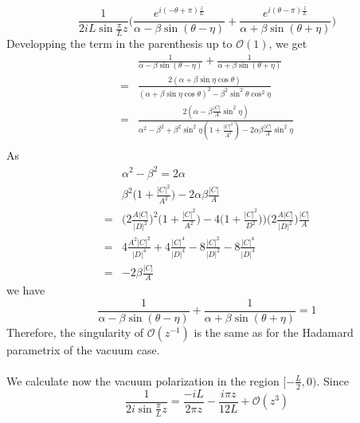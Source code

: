 \begin{equation}
\frac{1}{2i L\sin\frac{\pi}{L}z} \bigg( \frac{e^{i(-\theta + \pi)\frac{z}{L}}}{\alpha - \beta \sin (\theta - \eta)}
+ \frac{e^{i(\theta - \pi) \frac{z}{L}}}{\alpha + \beta \sin (\theta + \eta)}
\bigg)
\end{equation}
Developping the term in the parenthesis up to $\mathcal{O}(1)$, we get
\begin{equation}
\begin{split}
& \frac{1}{\alpha - \beta \sin (\theta - \eta)}
   + \frac{1}{\alpha + \beta \sin (\theta + \eta)} \\
= & \frac{2(\alpha + \beta \sin \eta \cos \theta)}{(\alpha + \beta \sin \eta \cos \theta)^2 - \beta^2 \sin^2 \theta \cos^2 \eta} \\
= & \frac{2(\alpha - \beta \frac{|C|}{A} \sin^2 \eta)}{\alpha^2 - \beta^2 + \beta^2 \sin^2 \eta (1 + \frac{|C|^2}{A^2}) - 2 \alpha \beta \frac{|C|}{A} \sin^2 \eta} \\
\end{split}
\end{equation}
As
\begin{equation*}
\begin{split}
& \alpha^2 - \beta ^ 2 = 2 \alpha \\
&  \beta^2 \big(1 + \frac{|C|^2}{A^2} \big) - 2 \alpha \beta \frac{|C|}{A} \\
= & \big(2\frac{A |C|}{|D|^2} \big)^2 \big( 1+ \frac{|C|^2}{A^2} \big) - 4\big( 1+ \frac{|C|^2}{D^2}))\big(2\frac{A |C|}{|D|^2} \big) \frac{|C|}{A}  \\
= & 4 \frac{A^2 |C|^2}{|D|^4} + 4\frac{|C|^4}{|D|^4} - 8\frac{|C|^2}{|D|^2} - 8\frac{|C|^4}{|D|^4} \\
= & -2 \beta \frac{|C|}{A}
\end{split}
\end{equation*}
we have
\begin{equation}\label{nef-lourdeur}
\frac{1}{\alpha - \beta \sin (\theta - \eta)}
   + \frac{1}{\alpha + \beta \sin (\theta + \eta)} 
= 1
\end{equation}
Therefore, the singularity of $\mathcal{O}(z^{-1})$ is the same as for the Hadamard parametrix of the vacuum case.\\\\
We calculate now the vacuum polarization in the region $[-\frac{L}{2}, 0)$. Since
\begin{equation*}
\frac{1}{2i \sin \frac{\pi}{L}z } = \frac{-iL}{2 \pi z} - \frac{i \pi z}{12L} + \mathcal{O}(z^3) 
\end{equation*}
